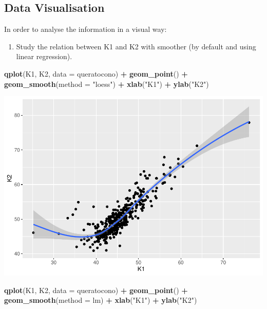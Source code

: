 \documentclass[
]{article}
\newenvironment{Shaded}{\begin{snugshade}}{\end{snugshade}}
\newcommand{\DataTypeTok}[1]{\textcolor[rgb]{0.13,0.29,0.53}{#1}}
\newcommand{\KeywordTok}[1]{\textcolor[rgb]{0.13,0.29,0.53}{\textbf{#1}}}
\newcommand{\NormalTok}[1]{#1}
\newcommand{\OperatorTok}[1]{\textcolor[rgb]{0.81,0.36,0.00}{\textbf{#1}}}
\newcommand{\StringTok}[1]{\textcolor[rgb]{0.31,0.60,0.02}{#1}}
\providecommand{\tightlist}{%
  \setlength{\itemsep}{0pt}\setlength{\parskip}{0pt}}
\begin{document}
\hypertarget{data-visualisation}{%
\subsection{Data Visualisation}\label{data-visualisation}}

In order to analyse the information in a visual way:

\begin{enumerate}
\def\labelenumi{\arabic{enumi}.}
\tightlist
\item
  Study the relation between K1 and K2 with smoother (by default and
  using linear regression).
\end{enumerate}

\begin{Shaded}
\begin{Highlighting}[]
\KeywordTok{qplot}\NormalTok{(K1, K2, }\DataTypeTok{data =}\NormalTok{ queratocono) }\OperatorTok{+}
\StringTok{  }\KeywordTok{geom_point}\NormalTok{() }\OperatorTok{+}\StringTok{ }
\StringTok{  }\KeywordTok{geom_smooth}\NormalTok{(}\DataTypeTok{method =} \StringTok{"loess"}\NormalTok{) }\OperatorTok{+}
\StringTok{  }\KeywordTok{xlab}\NormalTok{(}\StringTok{"K1"}\NormalTok{) }\OperatorTok{+}\StringTok{ }\KeywordTok{ylab}\NormalTok{(}\StringTok{"K2"}\NormalTok{)}
\end{Highlighting}
\end{Shaded}

\includegraphics{document_files/figure-latex/unnamed-chunk-3-1.pdf}

\begin{Shaded}
\begin{Highlighting}[]
\KeywordTok{qplot}\NormalTok{(K1, K2, }\DataTypeTok{data =}\NormalTok{ queratocono) }\OperatorTok{+}
\StringTok{  }\KeywordTok{geom_point}\NormalTok{() }\OperatorTok{+}
\StringTok{  }\KeywordTok{geom_smooth}\NormalTok{(}\DataTypeTok{method =}\NormalTok{ lm) }\OperatorTok{+}
\StringTok{  }\KeywordTok{xlab}\NormalTok{(}\StringTok{"K1"}\NormalTok{) }\OperatorTok{+}\StringTok{ }\KeywordTok{ylab}\NormalTok{(}\StringTok{"K2"}\NormalTok{)}
\end{Highlighting}
\end{Shaded}
\end{document}

